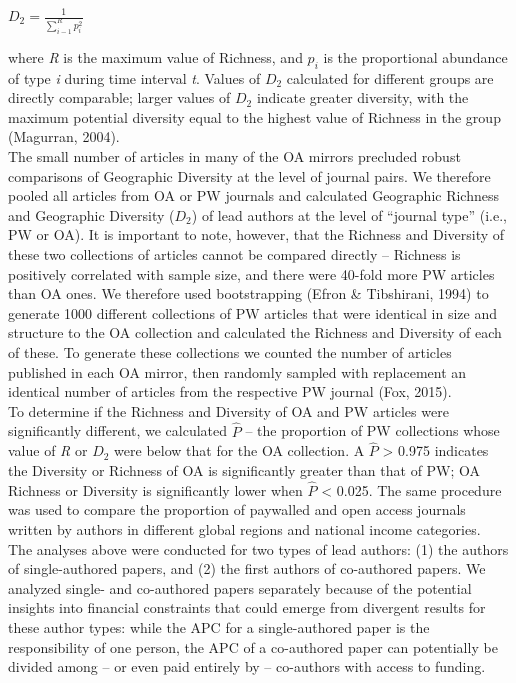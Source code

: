 \documentclass[english,man]{apa6}
\begin{document}
\(D_{2}=\frac{1}{\sum_{i-1}^{R} p_{i}^{2}}\)

where \emph{R} is the maximum value of Richness, and \(p_{i}\) is the proportional abundance of type \emph{i} during time interval \emph{t}. Values of \(D_{2}\) calculated for different groups are directly comparable; larger values of \(D_{2}\) indicate greater diversity, with the maximum potential diversity equal to the highest value of Richness in the group (Magurran, 2004).\\
The small number of articles in many of the OA mirrors precluded robust comparisons of Geographic Diversity at the level of journal pairs. We therefore pooled all articles from OA or PW journals and calculated Geographic Richness and Geographic Diversity (\(D_{2}\)) of lead authors at the level of \enquote{journal type} (i.e., PW or OA). It is important to note, however, that the Richness and Diversity of these two collections of articles cannot be compared directly -- Richness is positively correlated with sample size, and there were 40-fold more PW articles than OA ones. We therefore used bootstrapping (Efron \& Tibshirani, 1994) to generate 1000 different collections of PW articles that were identical in size and structure to the OA collection and calculated the Richness and Diversity of each of these. To generate these collections we counted the number of articles published in each OA mirror, then randomly sampled with replacement an identical number of articles from the respective PW journal (Fox, 2015).\\
To determine if the Richness and Diversity of OA and PW articles were significantly different, we calculated \(\hat{P}\) -- the proportion of PW collections whose value of \emph{R} or \(D_{2}\) were below that for the OA collection. A \(\hat{P}\) \textgreater{} 0.975 indicates the Diversity or Richness of OA is significantly greater than that of PW; OA Richness or Diversity is significantly lower when \(\hat{P}\) \textless{} 0.025. The same procedure was used to compare the proportion of paywalled and open access journals written by authors in different global regions and national income categories.\\
The analyses above were conducted for two types of lead authors: (1) the authors of single-authored papers, and (2) the first authors of co-authored papers. We analyzed single- and co-authored papers separately because of the potential insights into financial constraints that could emerge from divergent results for these author types: while the APC for a single-authored paper is the responsibility of one person, the APC of a co-authored paper can potentially be divided among -- or even paid entirely by -- co-authors with access to funding.\\
\end{document}
